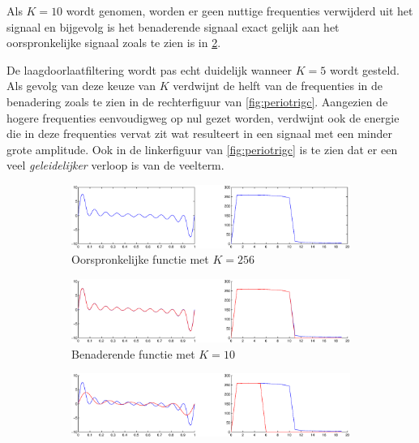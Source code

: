 \documentclass[a4paper]{article}
\begin{document}
Als $K=10$ wordt genomen, worden er geen nuttige frequenties verwijderd uit het signaal en bijgevolg is het benaderende signaal exact gelijk aan het oorspronkelijke signaal zoals te zien is in \ref{fig:periotrigb}.

De laagdoorlaatfiltering wordt pas echt duidelijk wanneer $K=5$ wordt gesteld. Als gevolg van deze keuze van $K$ verdwijnt de helft van de frequenties in de benadering zoals te zien in de rechterfiguur van \ref{fig:periotrigc}. Aangezien de hogere frequenties eenvoudigweg op nul gezet worden, verdwijnt ook de energie die in deze frequenties vervat zit wat resulteert in een signaal met een minder grote amplitude. Ook in de linkerfiguur van \ref{fig:periotrigc} is te zien dat er een veel \textit{geleidelijker} verloop is van de veelterm.
\begin{figure}
    \centering
    \begin{subfigure}[b]{\textwidth}
        \centering
        \includegraphics[width=\textwidth, height=0.3\textwidth]{periotriga.eps}
        \caption{Oorspronkelijke functie met $K=256$}
        \label{fig:periotriga}
        \vspace*{1cm}
    \end{subfigure}
    \begin{subfigure}[b]{\textwidth}
        \centering
        \includegraphics[width=\textwidth]{periotrigb.eps}
        \caption{Benaderende functie met $K=10$}
        \label{fig:periotrigb}
        \vspace*{1cm}
    \end{subfigure}
    \hfill
    \begin{subfigure}[b]{\textwidth}
        \centering
        \includegraphics[width=\textwidth]{periotrigc.eps}

\end{subfigure}
\end{figure}
\end{document}
